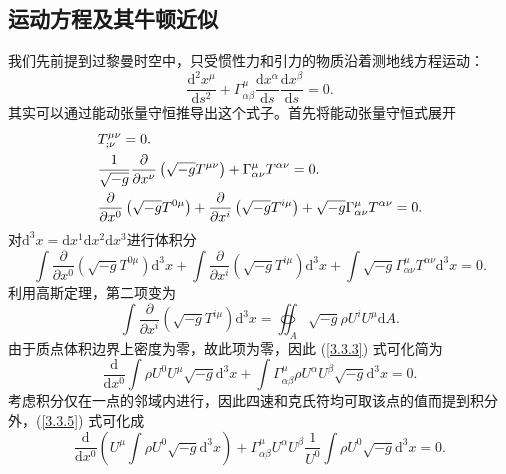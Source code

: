 \documentclass[11pt, a4paper, oneside, onecolumn]{ctexart}
\numberwithin{equation}{subsection}
\begin{document}
\subsection{运动方程及其牛顿近似}
我们先前提到过黎曼时空中，只受惯性力和引力的物质沿着测地线方程运动：
\begin{equation}
\frac{\mathrm{d}^{2}x^{\mu}}{\mathrm{d}s^{2}}+\Gamma_{\alpha\beta}^{\mu}\frac{\mathrm{d}x^{\alpha}}{\mathrm{d}s}\frac{\mathrm{d}x^{\beta}}{\mathrm{d}s}=0.
\end{equation}
其实可以通过能动张量守恒推导出这个式子。首先将能动张量守恒式展开
\begin{align}
&T^{\mu\nu}_{;\nu}=0.\\
&\frac{1}{\sqrt{-g}}\frac{\partial{}}{\partial{}x^{\nu}}\left(\sqrt{-g}T^{\mu\nu}\right)+\Gamma_{\alpha\nu}^{\mu}T^{\alpha\nu}=0.\notag\\
&\frac{\partial{}}{\partial{}x^{0}}\left(\sqrt{-g}T^{0\mu}\right)+\frac{\partial{}}{\partial{}x^{i}}\left(\sqrt{-g}T^{i\mu}\right)+\sqrt{-g}\Gamma_{\alpha\nu}^{\mu}T^{\alpha\nu}=0.\notag
\end{align}
对$\mathrm{d}^{3}x=\mathrm{d}x^{1}\mathrm{d}x^{2}\mathrm{d}x^{3}$进行体积分
\begin{equation}
\int\frac{\partial{}}{\partial{}x^{0}}\left(\sqrt{-g}T^{0\mu}\right)\mathrm{d}^{3}x+\int\frac{\partial{}}{\partial{}x^{i}}\left(\sqrt{-g}T^{i\mu}\right)\mathrm{d}^{3}x+\int\sqrt{-g}\Gamma_{\alpha\nu}^{\mu}T^{\alpha\nu}\mathrm{d}^{3}x=0.\label{3.3.3}
\end{equation}
利用高斯定理，第二项变为
\begin{equation}
\int\frac{\partial{}}{\partial{}x^{i}}\left(\sqrt{-g}T^{i\mu}\right)\mathrm{d}^{3}x=\oiint_{A}\sqrt{-g}\rho U^{i}U^{\mu}\mathrm{d}A.
\end{equation}
由于质点体积边界上密度为零，故此项为零，因此 (\ref{3.3.3}) 式可化简为
\begin{equation}
\frac{\mathrm{d}}{\mathrm{d}x^{0}}\int\rho U^{0}U^{\mu}\sqrt{-g}\mathrm{d}^{3}x+\int\Gamma_{\alpha\beta}^{\mu}\rho U^{\alpha}U^{\beta}\sqrt{-g}\mathrm{d}^{3}x=0.\label{3.3.5}
\end{equation}
考虑积分仅在一点的邻域内进行，因此四速和克氏符均可取该点的值而提到积分外，(\ref{3.3.5}) 式可化成
\begin{equation}
\frac{\mathrm{d}}{\mathrm{d}x^{0}}\left(U^{\mu}\int\rho U^{0}\sqrt{-g}\mathrm{d}^{3}x\right)+\Gamma_{\alpha\beta}^{\mu}U^{\alpha}U^{\beta}\frac{1}{U^{0}}\int\rho U^{0}\sqrt{-g}\mathrm{d}^{3}x=0.\label{3.3.6}
\end{equation}
\end{document}
